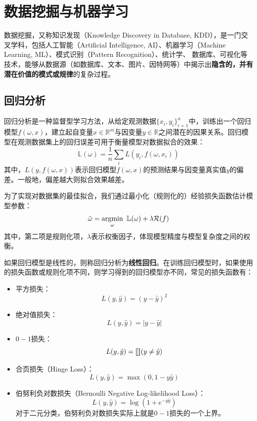 \part{数据挖掘与机器学习}
数据挖掘，又称知识发现（Knowledge Discovery in Database, KDD），是一门交叉学科，包括人工智能（Artificial Intelligence, AI）、机器学习（Machine Learning, ML）、模式识别（Pattern Recognition）、统计学、 数据库、可视化等技术，能够从数据源（如数据库、文本、图片、因特网等）中揭示出\textbf{隐含的，并有潜在价值的模式或规律}的复杂过程。


\chapter{回归分析}
回归分析是一种监督型学习方法，从给定观测数据$\{x_i,y_i\}_{i=1}^n$中，训练出一个回归模型$f(\omega,x)$，建立起自变量$x\in \mathbb{R}^m$与因变量$y\in \mathbb{R}$之间潜在的因果关系。回归模型在观测数据集上的回归误差可用于衡量模型对数据拟合的效果：
\begin{equation}
    \mathbb{L}(\omega) = \frac{1}{n} \sum\limits_i L(y_i,f(\omega,x_i))
\end{equation}
其中，$L(y,f(\omega,x))$表示回归模型$f(\omega,x)$的预测结果与因变量真实值$y$的偏差。一般地，偏差越大则拟合效果越差。

为了实现对数据集的最佳拟合，我们通过最小化（规则化的）经验损失函数估计模型参数：
\begin{equation}
    \hat\omega = \operatorname*{\mathrm{\arg\!\min}}\limits_{\omega}~\mathbb{L}(\omega) + \lambda \mathcal R(f)
\end{equation}
其中，第二项是规则化项，$\lambda$表示权衡因子，体现模型精度与模型复杂度之间的权衡。

如果回归模型是线性的，则称回归分析为\textbf{线性回归}。在训练回归模型时，如果使用的损失函数或规则化项不同，则学习得到的回归模型亦不同，常见的损失函数有：
\begin{itemize}
  \item 平方损失：
  \begin{equation}
    L(y,\hat y) = (y-\hat y)^2
  \end{equation}
  \item 绝对值损失：
  \begin{equation}
    L(y,\hat y) = |y-\hat y|
  \end{equation}
  \item $0-1$损失：
  \begin{equation}
    L(y,\hat y) = \operatorname{[\![]\!]}(y\ne \hat y)
  \end{equation}
  \item 合页损失（Hinge Loss）：
  \begin{equation}
    L(y,\hat y) = \max(0, 1-y \hat y)
  \end{equation}
  \item 伯努利负对数损失（Bernoulli Negative Log-likelihood Loss）：
  \begin{equation}
    L(y,\hat y) = \log (1+e^{-y\hat y})
  \end{equation}
  对于二元分类，伯努利负对数损失实际上就是$0-1$损失的一个上界。
\end{itemize}

